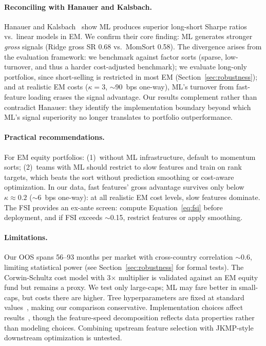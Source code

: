 \documentclass[sigconf,review,anonymous,balance=false]{acmart}
\begin{document}
\paragraph{Reconciling with Hanauer and Kalsbach.}
Hanauer and Kalsbach~\cite{hanauer2023machine} show ML produces superior
long-short Sharpe ratios vs.\ linear models in EM. We confirm their
core finding: ML generates stronger \emph{gross} signals (Ridge gross
SR 0.68 vs.\ MomSort 0.58). The divergence arises from the evaluation
framework: we benchmark against factor sorts (sparse, low-turnover,
and thus a harder cost-adjusted benchmark); we evaluate long-only
portfolios, since short-selling is restricted in most EM
(Section~\ref{sec:robustness}); and at
realistic EM costs ($\kappa = 3$, $\sim$90~bps one-way), ML's turnover
from fast-feature loading erases the signal advantage. Our results
complement rather than contradict Hanauer: they identify the
implementation boundary beyond which ML's signal superiority no longer
translates to portfolio outperformance.

\paragraph{Practical recommendations.}
For EM equity portfolios: (1)~without ML infrastructure, default to
momentum sorts; (2)~teams with ML should restrict to
slow features and train on rank targets, which beats the sort without
prediction smoothing or cost-aware optimization. In our data, fast features'
gross advantage survives only below $\kappa \approx 0.2$
(${\sim}$6~bps one-way): at all realistic EM cost levels, slow
features dominate.
The FSI provides an ex-ante screen: compute Equation~\ref{eq:fsi} before
deployment, and if FSI exceeds $\sim$0.15, restrict features or apply
smoothing.

\paragraph{Limitations.}
Our OOS spans 56--93 months per market with cross-country correlation
${\sim}$0.6, limiting statistical power (see
Section~\ref{sec:robustness} for formal tests). The Corwin-Schultz
cost model with 3$\times$ multiplier is validated against an EM equity
fund but remains a proxy. We test only large-caps; ML may fare better
in small-caps, but costs there are higher. Tree hyperparameters are
fixed at standard values~\cite{gu2020empirical}, making our comparison
conservative. Implementation choices affect
results~\cite{chen2025nonstandard}, though the feature-speed
decomposition reflects data properties rather than modeling choices.
Combining upstream feature selection with JKMP-style downstream
optimization is untested.
\end{document}

